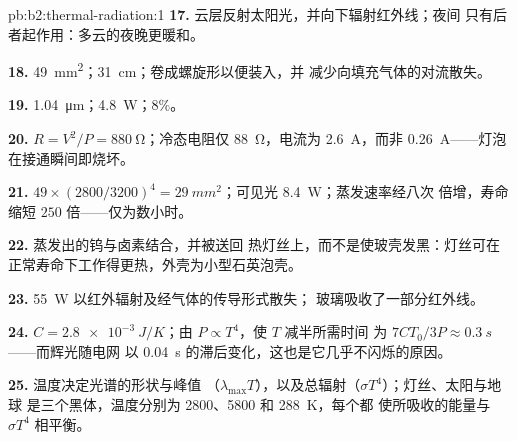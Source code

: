 \begin{solution}{pb:b2:thermal-radiation:1}
\textbf{17.} 云层反射太阳光，并向下辐射红外线；夜间
只有后者起作用：多云的夜晚更暖和。

\textbf{18.} \qty{49}{mm^2}；\qty{31}{cm}；卷成螺旋形以便装入，并
减少向填充气体的对流散失。

\textbf{19.} \qty{1.04}{\micro m}；\qty{4.8}{W}；$8\%$。

\textbf{20.} $R = V^2/P = \qty{880}{\ohm}$；冷态电阻仅 \qty{88}{\ohm}，电流为
\qty{2.6}{A}，而非 \qty{0.26}{A}——灯泡在接通瞬间即烧坏。

\textbf{21.} $49 \times (2800/3200)^4 = \qty{29}{mm^2}$；可见光 \qty{8.4}{W}；蒸发速率经八次
倍增，寿命缩短 $250$ 倍——仅为数小时。

\textbf{22.} 蒸发出的钨与卤素结合，并被送回
热灯丝上，而不是使玻壳发黑：灯丝可在
正常寿命下工作得更热，外壳为小型石英泡壳。

\textbf{23.} \qty{55}{W} 以红外辐射及经气体的传导形式散失；
玻璃吸收了一部分红外线。

\textbf{24.} $C = \qty{2.8e-3}{J/K}$；由 $P \propto T^4$，使 $T$ 减半所需时间
为 $7CT_0/3P \approx \qty{0.3}{s}$——而辉光随电网
以 \qty{0.04}{s} 的滞后变化，这也是它几乎不闪烁的原因。

\textbf{25.} 温度决定光谱的形状与峰值
（$\lambda_{\max}T$），以及总辐射（$\sigma T^4$）；灯丝、太阳与地球
是三个黑体，温度分别为 \qty{2800}{}、\qty{5800}{} 和 \qty{288}{K}，每个都
使所吸收的能量与 $\sigma T^4$ 相平衡。
\end{solution}
